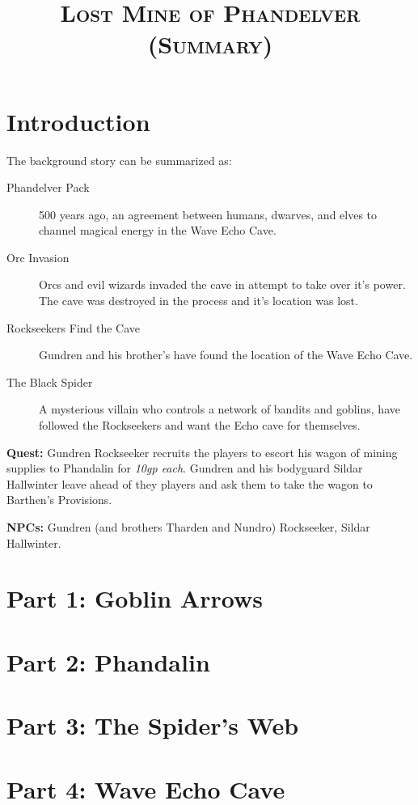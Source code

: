 \documentclass{article}
\title{\textsc{\Huge Lost Mine of Phandelver (Summary)}}
\date{ }
\begin{document}
	\maketitle
	\begin{multicols*}{2}
	
	\section{Introduction}
	The background story can be summarized as:
	\begin{description}
		\item[Phandelver Pack] 500 years ago, an agreement between humans, dwarves, and elves to channel magical energy in the Wave Echo Cave.
		\item[Orc Invasion] Orcs and evil wizards invaded the cave in attempt to take over it's power. The cave was destroyed in the process and it's location was lost.
		\item[Rockseekers Find the Cave] Gundren and his brother's have found the location of the Wave Echo Cave.
		\item[The Black Spider] A mysterious villain who controls a network of bandits and goblins, have followed the Rockseekers and want the Echo cave for themselves.
	\end{description}

	\textbf{Quest:} Gundren Rockseeker recruits the players to escort his wagon of mining supplies to Phandalin for \emph{10gp each}. Gundren and his bodyguard Sildar Hallwinter leave ahead of they players and ask them to take the wagon to Barthen's Provisions.
	
	\textbf{NPCs:} Gundren (and brothers Tharden and Nundro) Rockseeker, Sildar Hallwinter.

	\section{Part 1: Goblin Arrows}
	\section{Part 2: Phandalin}
	\section{Part 3: The Spider's Web}
	\section{Part 4: Wave Echo Cave}
	
	\end{multicols*}
	
\end{document}

